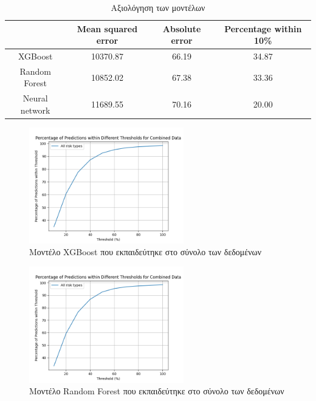 \documentclass{llncs}
\begin{document}
\begin{table}
    \centering
    \begin{tabular}{|c|c|c|c|} %
        \hline
         &Mean squared error & Absolute error & Percentage within 10\% \\ %
        \hline
        XGBoost & 10370.87 & 66.19 & 34.87 \\
        Random Forest & 10852.02 & 67.38 & 33.36 \\
        Neural network & 11689.55 & 70.16 & 20.00 \\
        \hline
    \end{tabular}
    \caption{Αξιολόγηση των μοντέλων}
    \label{tab:3x3table}
\end{table}

\begin{figure}
    \begin{center}
        \includegraphics[width=0.6\textwidth]{images/combined_trained_all_thresholds_xgb.png}
    \end{center}
    \caption{Μοντέλο XGBoost που εκπαιδεύτηκε στο σύνολο των δεδομένων}  
    \label{fig:XGBoost_result}  
\end{figure}

\begin{figure}
    \begin{center}
        \includegraphics[width=0.6\textwidth]{images/combined_trained_all_thresholds_random_forest.png}
    \end{center}
    \caption{Μοντέλο Random Forest που εκπαιδεύτηκε στο σύνολο των δεδομένων}  
    \label{fig:random_forest_result}  
\end{figure}
\end{document}
